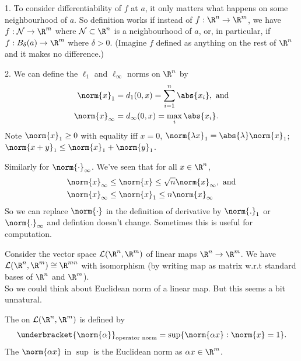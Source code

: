 \begin{remark}
    1. To consider differentiability of $f$ at $a$, it only matters what happens on some neighbourhood of $a$. 
    So definition works if instead of $f:\R^n\to \R^m$, we have $f:\mathcal{N}\to \R^m$ where $\mathcal{N}\subset \R^n$ is a neighbourhood of $a$, or, in particular, if $f:B_\delta(a)\to \R^m$ where $\delta > 0$. 
    (Imagine $f$ defined as anything on the rest of $\R^n$ and it makes no difference.)

    2. We can define the $\ell_1$ and $\ell_\infty$ norms on $\R^n$ by 
    \begin{align*}
        \norm{x}_1 &= d_1(0,x) =  \sum_{i=1}^n \abs{x_i}, \textup{ and}\\
        \norm{x}_\infty & =  d_\infty(0,x) = \max_i\abs{x_i}.
    \end{align*}
    Note $\norm{x}_1\ge 0$ with equality iff $x=0$, $\norm{\lambda x}_1 = \abs{\lambda}\norm{x}_1$; $\norm{x+y}_1 \leq \norm{x}_1 + \norm{y}_1$.

    Similarly for $\norm{\cdot}_\infty$. We've seen that for all $x\in \R^n$,
    \begin{align*}
        \norm{x}_\infty &\leq \norm{x} \leq \sqrt{n}\norm{x}_\infty, \textup{ and}\\
        \norm{x}_\infty &\leq \norm{x}_1 \leq n\norm{x}_\infty
    \end{align*}
    So we can replace $\norm{\cdot}$ in the definition of derivative by $\norm{.}_1$ or $\norm{.}_\infty$ and defintion doesn't change. Sometimes this is useful for computation.
\end{remark}

Consider the vector space $\mathcal{L}(\R^n,\R^m)$ of linear maps $\R^n\to \R^m$. We have $\mathcal{L}(\R^n,\R^m) \cong \R^{mn}$ with isomorphism (by writing map as matrix w.r.t standard bases of $\R^n$ and $\R^m$). \\
So we could think about Euclidean norm of a linear map. But this seems a bit unnatural.

\begin{definition}
    The  on $\mathcal{L}(\R^n,\R^m)$ is defined by 
    \begin{align*}
        \underbracket{\norm{\alpha}}_{\textup{operator norm}} = \sup\Set{ \norm{\alpha x}}{\norm{x} = 1}.
    \end{align*} 
    The $\norm{\alpha x}$ in $\sup$ is the Euclidean norm as $\alpha  x\in \R^m$. 
\end{definition}

